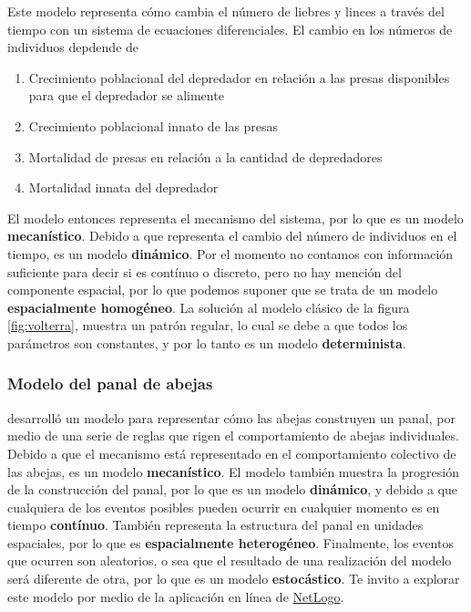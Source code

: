 \documentclass[
]{book}
\providecommand{\tightlist}{%
  \setlength{\itemsep}{0pt}\setlength{\parskip}{0pt}}
\begin{document}
Este modelo representa cómo cambia el número de liebres y linces a través del tiempo con un sistema de ecuaciones diferenciales. El cambio en los números de individuos depdende de

\begin{enumerate}
\def\labelenumi{\arabic{enumi}.}
\tightlist
\item
  Crecimiento poblacional del depredador en relación a las presas disponibles para que el depredador se alimente
\item
  Crecimiento poblacional innato de las presas
\item
  Mortalidad de presas en relación a la cantidad de depredadores
\item
  Mortalidad innata del depredador
\end{enumerate}

El modelo entonces representa el mecanismo del sistema, por lo que es un modelo \textbf{mecanístico}. Debido a que representa el cambio del número de individuos en el tiempo, es un modelo \textbf{dinámico}. Por el momento no contamos con información suficiente para decir si es contínuo o discreto, pero no hay mención del componente espacial, por lo que podemos suponer que se trata de un modelo \textbf{espacialmente homogéneo}. La solución al modelo clásico de la figura \ref{fig:volterra}, muestra un patrón regular, lo cual se debe a que todos los parámetros son constantes, y por lo tanto es un modelo \textbf{determinista}.

\hypertarget{modelo-del-panal-de-abejas}{%
\subsubsection{Modelo del panal de abejas}\label{modelo-del-panal-de-abejas}}

\citet{wilensksi2003honey} desarrolló un modelo para representar cómo las abejas construyen un panal, por medio de una serie de reglas que rigen el comportamiento de abejas individuales. Debido a que el mecanismo está representado en el comportamiento colectivo de las abejas, es un modelo \textbf{mecanístico}. El modelo también muestra la progresión de la construcción del panal, por lo que es un modelo \textbf{dinámico}, y debido a que cualquiera de los eventos posibles pueden ocurrir en cualquier momento es en tiempo \textbf{contínuo}. También representa la estructura del panal en unidades espaciales, por lo que es \textbf{espacialmente heterogéneo}. Finalmente, los eventos que ocurren son aleatorios, o sea que el resultado de una realización del modelo será diferente de otra, por lo que es un modelo \textbf{estocástico}. Te invito a explorar este modelo por medio de la aplicación en línea de \href{https://www.netlogoweb.org/launch\#https://www.netlogoweb.org/assets/modelslib/Sample\%20Models/Biology/Honeycomb.nlogo}{NetLogo}.
\end{document}
